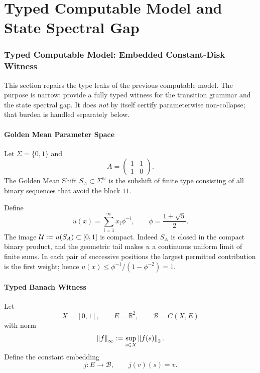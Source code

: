 ﻿\part{Typed Computable Model and State Spectral Gap}
\section{Typed Computable Model: Embedded Constant-Disk Witness}

This section repairs the type leaks of the previous computable model. The purpose is narrow: provide a fully typed witness for the transition grammar and the state spectral gap. It does \emph{not} by itself certify parameterwise non-collapse; that burden is handled separately below.

\subsection{Golden Mean Parameter Space}

\begin{definition}
Let $\Sigma=\{0,1\}$ and
\[
A=
\begin{pmatrix}
1 & 1\\
1 & 0
\end{pmatrix}.
\]
The Golden Mean Shift $S_A\subset \Sigma^{\mathbb{N}}$ is the subshift of finite type consisting of all binary sequences that avoid the block $11$.
\end{definition}

\begin{definition}
Define
\[
u(x)=\sum_{i=1}^{\infty} x_i\phi^{-i},
\qquad
\phi=\frac{1+\sqrt{5}}{2}.
\]
The image $\mathcal{U}:=u(S_A)\subset [0,1]$ is compact. Indeed $S_A$ is closed in
the compact binary product, and the geometric tail makes $u$ a continuous
uniform limit of finite sums. In each pair of successive positions the
largest permitted contribution is the first weight; hence
$u(x)\leq\phi^{-1}/(1-\phi^{-2})=1$.
\end{definition}

\subsection{Typed Banach Witness}

\begin{definition}
Let
\[
X=[0,1],
\qquad
E=\mathbb{R}^2,
\qquad
\mathcal{B}=C(X,E)
\]
with norm
\[
\left\lVert f \right\rVert_\infty:=\sup_{s\in X}\left\lVert f(s) \right\rVert_2.
\]
Define the constant embedding
\[
j:E\to \mathcal{B},
\qquad
j(v)(s)=v.
\]
\end{definition}

